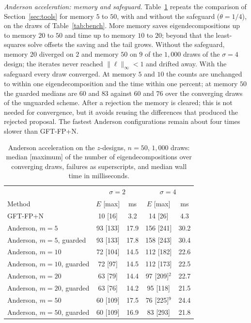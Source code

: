 \documentclass[11pt]{article}
\begin{document}
\emph{Anderson acceleration: memory and safeguard.}
Table~\ref{tab:aasweep} repeats the comparison of
Section~\ref{sec:tools} for memory $5$ to $50$, with and without the
safeguard ($\theta=1/4$), on the draws of Table~\ref{tab:bench}.
More memory saves eigendecompositions up to memory $20$ to $50$ and
time up to memory $10$ to $20$; beyond that the least-squares solve
offsets the saving and the tail grows. Without the safeguard, memory
$20$ diverged on $2$ and memory $50$ on $9$ of the $1{,}000$ draws of
the $\sigma=4$ design; the iterates never reached $\|\ell\|_{\infty}<1$
and drifted away. With the safeguard every draw converged. At memory
$5$ and $10$ the counts are unchanged to within one eigendecomposition
and the time within one percent; at memory $50$ the guarded medians
are $60$ and $83$ against $60$ and $76$ over the converging draws of
the unguarded scheme. After a rejection the memory is cleared; this
is not needed for convergence, but it avoids reusing the differences
that produced the rejected proposal. The fastest Anderson
configurations remain about four times slower than GFT-FP+N.

\begin{table}[h]
\centering
\caption{Anderson acceleration on the $z$-designs, $n=50$, $1{,}000$
draws: median [maximum] of the number of eigendecompositions over
converging draws, failures as superscripts, and median wall time in
milliseconds.}\label{tab:aasweep}
\medskip
\begin{tabular}{lcc|cc}
\toprule
 & \multicolumn{2}{c|}{$\sigma=2$} & \multicolumn{2}{c}{$\sigma=4$}\\
Method & $E$ [max] & ms & $E$ [max] & ms\\
\midrule
GFT-FP+N & 10 [16] & 3.2 & 14 [26] & 4.3\\
Anderson, $m=5$ & 93 [133] & 17.9 & 156 [241] & 30.2\\
Anderson, $m=5$, guarded & 93 [133] & 17.8 & 158 [243] & 30.4\\
Anderson, $m=10$ & 72 [104] & 14.5 & 112 [182] & 22.6\\
Anderson, $m=10$, guarded & 72 [97] & 14.5 & 112 [173] & 22.5\\
Anderson, $m=20$ & 63 [79] & 14.4 & 97 [209]$^{2}$ & 22.7\\
Anderson, $m=20$, guarded & 63 [76] & 14.2 & 95 [118] & 21.5\\
Anderson, $m=50$ & 60 [109] & 17.5 & 76 [225]$^{9}$ & 24.4\\
Anderson, $m=50$, guarded & 60 [109] & 16.9 & 83 [293] & 21.8\\
\bottomrule
\end{tabular}
\end{table}
\end{document}
